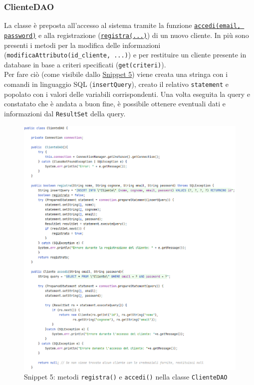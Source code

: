 \documentclass{article}
\newcommand{\code}[1]{\texttt{#1}}
\begin{document}
\subsubsection{ClienteDAO}
La classe è preposta all'accesso al sistema tramite la funzione \hyperref[fig:snippet_clienteDAO]{\code{accedi(email, password)}} e alla registrazione (\hyperref[fig:snippet_clienteDAO]{\code{registra(...)}}) di un nuovo cliente. In più sono presenti i metodi per la modifica delle informazioni (\code{modificaAttributo(id\_cliente, ...)}) e per restituire un cliente presente in database in base a criteri specificati (\code{get(criteri)}). \\
Per fare ciò (come visibile dallo \hyperref[fig:snippet_clienteDAO]{Snippet 5}) viene creata una stringa con i comandi in linguaggio SQL (\code{insertQuery}), creato il relativo \code{statement} e popolato con i valori delle variabili corrispondenti. Una volta eseguita la query e constatato che è andata a buon fine, è possibile ottenere eventuali dati e informazioni dal \code{ResultSet} della query.

\begin{figure}[H]
    \centering
    \includegraphics[scale=0.65]{resources/images/Snippets/snippet_clienteDAO.png}
    \captionsetup{labelformat=empty,labelsep=none}
    \caption{Snippet 5: metodi \code{registra()} e \code{accedi()} nella classe \code{ClienteDAO}}
    \label{fig:snippet_clienteDAO}
\end{figure}
\end{document}
